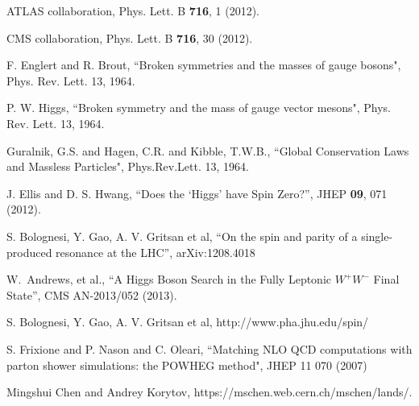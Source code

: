 \clearpage

\vspace*{-0.2cm}

ATLAS collaboration, Phys. Lett. B  {\bf 716}, 1 (2012).

CMS collaboration, Phys. Lett. B {\bf 716}, 30 (2012).



F. Englert and R. Brout, ``Broken symmetries and the masses of gauge bosons", Phys. Rev. Lett. 13,  1964.

P. W. Higgs, ``Broken symmetry and the mass of gauge vector mesons", Phys. Rev. Lett. 13, 1964.

Guralnik, G.S. and Hagen, C.R. and Kibble, T.W.B., ``Global Conservation Laws and Massless Particles", 
Phys.Rev.Lett. 13, 1964.

J. Ellis and D. S. Hwang, ``Does the `Higgs' have Spin Zero?'', JHEP {\bf 09}, 071 (2012). 

S. Bolognesi, Y. Gao, A. V. Gritsan et al, ``On the spin and parity of a single-produced resonance at the LHC'', arXiv:1208.4018



W.~Andrews, et al., ``A Higgs Boson Search in the Fully Leptonic $W^+W^-$ Final State'', CMS AN-2013/052 (2013).

S. Bolognesi, Y. Gao, A. V. Gritsan et al, http://www.pha.jhu.edu/spin/

S. Frixione and P. Nason and C. Oleari, 
``Matching {NLO QCD} computations with parton shower simulations: the {POWHEG} method",
  JHEP 11 070 (2007)

Mingshui Chen and Andrey Korytov, https://mschen.web.cern.ch/mschen/lands/.


